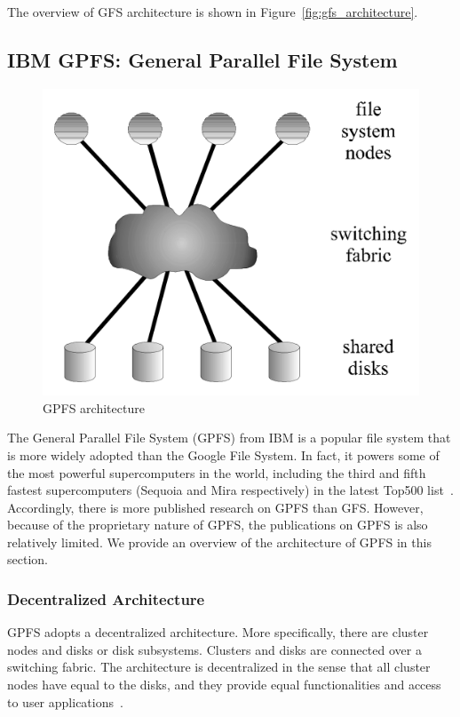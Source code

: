 The overview of GFS architecture is shown in Figure~\ref{fig:gfs_architecture}.



\subsection{IBM GPFS: General Parallel File System}
\label{sec:archi_gpfs}
%
\begin{figure}
\centering
\includegraphics[width=0.95\columnwidth]{image/gpfs_architecture.png}
\caption{GPFS architecture}
\label{fig:gpfs_archi}
\end{figure}
%
The General Parallel File System (GPFS) from IBM is a popular file system
that is more widely adopted than the Google File System. 
%
In fact, it powers some of the most powerful supercomputers in the world,
including the third and fifth fastest supercomputers (Sequoia and Mira 
respectively) in the latest Top500 list~\cite{Strohmaier:2006:TS:1188455.1188474}.
%
Accordingly, there is more published research on GPFS than GFS.
%
However, because of the proprietary nature of GPFS, the publications on 
GPFS is also relatively limited. 
%
We provide an overview of the architecture of GPFS in this section.


\subsubsection{Decentralized Architecture}
GPFS adopts a decentralized architecture.
%
More specifically, there are cluster nodes and disks or disk subsystems.
%
Clusters and disks are connected over a switching fabric.
%
The architecture is decentralized in the sense that all cluster nodes 
have equal to the disks, and they provide equal functionalities and access
to user applications~\cite{barkes1998gpfs,Schmuck2002}.

